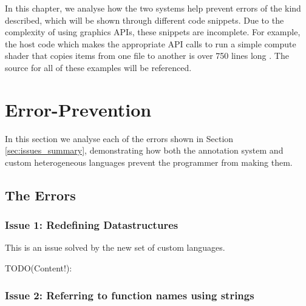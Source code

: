 \documentclass[a4paper,12pt,twoside,openright]{report}
\begin{document}
In this chapter, we analyse how the two systems help prevent errors of the kind
described, which will be shown through different code snippets. Due to the
complexity of using graphics APIs, these snippets are incomplete. For example,
the host code which makes the appropriate API calls to run a simple compute
shader that copies items from one file to another is over 750 lines long
\cite{TODO}. The source for all of these examples will be referenced.






\section{Error-Prevention}

In this section we analyse each of the errors shown in Section
\ref{sec:issues_summary}, demonstrating how both the annotation system and
custom heterogeneous languages prevent the programmer from making them.

\subsection{The Errors}

\subsubsection{Issue 1: Redefining Datastructures}

This is an issue solved by the new set of custom languages.

TODO(Content!):

\subsubsection{Issue 2: Referring to function names using strings}
\end{document}
